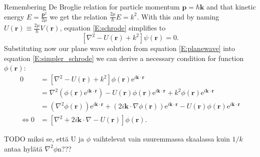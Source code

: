 \documentclass[a4paper, twoside, english, 12pt]{article}
\begin{document}
Remembering De Broglie relation for particle momentum $\mathbf{p}=\hbar\mathbf{k}$ and that kinetic energy $E=\frac{\mathbf{p}^2}{2\mu}$ we get the relation $\frac{2\mu}{\hbar}E=k^2$. With this and by naming $U(\mathbf{r})\equiv\frac{2\mu}{\hbar}V(\mathbf{r})$, equation \eqref{E:schrode} simplifies to
\begin{equation}\label{E:simpler_schrode}
	\left[\nabla^2-U(\mathbf{r})+k^2\right]\psi(\mathbf{r}) = 0.
\end{equation}
Substituting now our plane wave solution from equation \eqref{E:planewave} into equation \eqref{E:simpler_schrode} we can derive a necessary condition for function $\phi(\mathbf{r})$:
\begin{align}\label{E:phi_schrode}
	0 &= \left[\nabla^2-U(\mathbf{r})+k^2\right]\phi(\mathbf{r})\mathrm{e}^{i \mathbf{k}\cdot\mathbf{r}} \nonumber\\
	&=\nabla^2\left(\phi(\mathbf{r})\mathrm{e}^{i \mathbf{k}\cdot\mathbf{r}}\right)-U(\mathbf{r})\phi(\mathbf{r})\mathrm{e}^{i \mathbf{k}\cdot\mathbf{r}}+k^2\phi(\mathbf{r})\mathrm{e}^{i \mathbf{k}\cdot\mathbf{r}} \nonumber\\
	&=\left(\nabla^2\phi(\mathbf{r})\right)\mathrm{e}^{i \mathbf{k}\cdot\mathbf{r}} + \left(2i\mathbf{k}\cdot\nabla\phi(\mathbf{r})\right)\mathrm{e}^{i \mathbf{k}\cdot\mathbf{r}}  -U(\mathbf{r})\phi(\mathbf{r})\mathrm{e}^{i \mathbf{k}\cdot\mathbf{r}} \nonumber\\
\iff 0 &= \left[\nabla^2 +2i\mathbf{k}\cdot\nabla -U(\mathbf{r})\right]\phi(\mathbf{r}).
\end{align}

TODO miksi se, että U ja $\phi$ vaihtelevat vain suuremmassa skaalassa kuin $1/k$ antaa hylätä $\nabla^2\phi$n???
\end{document}
